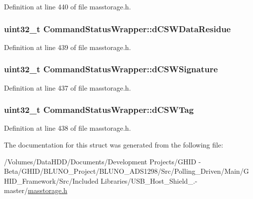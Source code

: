 \-Definition at line 440 of file masstorage.\-h.

\hypertarget{struct_command_status_wrapper_adf944665d28bb394a3d9756e8418d09e}{
\subsubsection[{d\-C\-S\-W\-Data\-Residue}]{\setlength{\rightskip}{0pt plus 5cm}uint32\-\_\-t {\bf \-Command\-Status\-Wrapper\-::d\-C\-S\-W\-Data\-Residue}}}\label{struct_command_status_wrapper_adf944665d28bb394a3d9756e8418d09e}


\-Definition at line 439 of file masstorage.\-h.

\hypertarget{struct_command_status_wrapper_a498a87759e737395829b6ff4b6420ad1}{
\subsubsection[{d\-C\-S\-W\-Signature}]{\setlength{\rightskip}{0pt plus 5cm}uint32\-\_\-t {\bf \-Command\-Status\-Wrapper\-::d\-C\-S\-W\-Signature}}}\label{struct_command_status_wrapper_a498a87759e737395829b6ff4b6420ad1}


\-Definition at line 437 of file masstorage.\-h.

\hypertarget{struct_command_status_wrapper_af872c29cfee3fb74e7ad9471ee4461fb}{
\subsubsection[{d\-C\-S\-W\-Tag}]{\setlength{\rightskip}{0pt plus 5cm}uint32\-\_\-t {\bf \-Command\-Status\-Wrapper\-::d\-C\-S\-W\-Tag}}}\label{struct_command_status_wrapper_af872c29cfee3fb74e7ad9471ee4461fb}


\-Definition at line 438 of file masstorage.\-h.



\-The documentation for this struct was generated from the following file\-:\begin{DoxyCompactItemize}
\item 
/\-Volumes/\-Data\-H\-D\-D/\-Documents/\-Development Projects/\-G\-H\-I\-D -\/ Beta/\-G\-H\-I\-D/\-B\-L\-U\-N\-O\-\_\-\-Project/\-B\-L\-U\-N\-O\-\_\-\-A\-D\-S1298/\-Src/\-Polling\-\_\-\-Driven/\-Main/\-G\-H\-I\-D\-\_\-\-Framework/\-Src/\-Included Libraries/\-U\-S\-B\-\_\-\-Host\-\_\-\-Shield\-\_.-\/master/\hyperlink{masstorage_8h}{masstorage.\-h}\end{DoxyCompactItemize}
